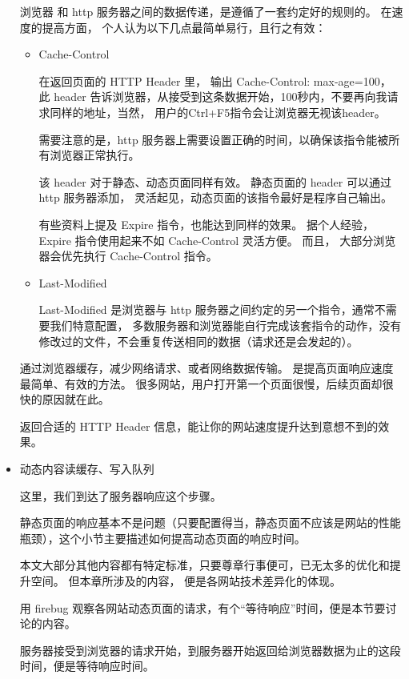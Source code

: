 \documentclass{article}
\begin{document}
\begin{itemize}
    浏览器 和 http 服务器之间的数据传递，是遵循了一套约定好的规则的。 在速度的提高方面，
    个人认为以下几点最简单易行，且行之有效：

    \begin{itemize}
    \item Cache-Control

      在返回页面的 HTTP Header 里， 输出 Cache-Control: max-age=100，
      此 header 告诉浏览器，从接受到这条数据开始，100秒内，不要再向我请求同样的地址，当然，
      用户的Ctrl+F5指令会让浏览器无视该header。

      需要注意的是，http 服务器上需要设置正确的时间，以确保该指令能被所有浏览器正常执行。

      该 header 对于静态、动态页面同样有效。 静态页面的 header 可以通过 http 服务器添加，
      灵活起见，动态页面的该指令最好是程序自己输出。

      有些资料上提及 Expire 指令，也能达到同样的效果。 据个人经验， Expire 指令使用起来不如 Cache-Control
      灵活方便。 而且， 大部分浏览器会优先执行 Cache-Control 指令。

    \item Last-Modified

      Last-Modified 是浏览器与 http 服务器之间约定的另一个指令，通常不需要我们特意配置，
      多数服务器和浏览器能自行完成该套指令的动作，没有修改过的文件，不会重复传送相同的数据（请求还是会发起的）。
    \end{itemize}

    通过浏览器缓存，减少网络请求、或者网络数据传输。 是提高页面响应速度最简单、有效的方法。
    很多网站，用户打开第一个页面很慢，后续页面却很快的原因就在此。

    返回合适的 HTTP Header 信息，能让你的网站速度提升达到意想不到的效果。
    
  \item 动态内容读缓存、写入队列

    这里，我们到达了服务器响应这个步骤。

    静态页面的响应基本不是问题（只要配置得当，静态页面不应该是网站的性能瓶颈），这个小节主要描述如何提高动态页面的响应时间。

    本文大部分其他内容都有特定标准，只要尊章行事便可，已无太多的优化和提升空间。 但本章所涉及的内容，
    便是各网站技术差异化的体现。

    用 firebug 观察各网站动态页面的请求，有个“等待响应”时间，便是本节要讨论的内容。

    服务器接受到浏览器的请求开始，到服务器开始返回给浏览器数据为止的这段时间，便是等待响应时间。


\end{itemize}
\end{document}
